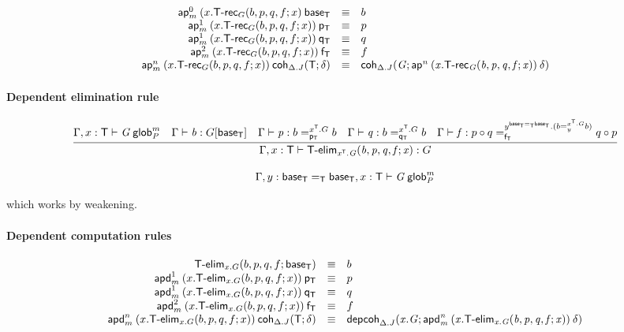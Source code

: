 \begin{small}
  \[
  \begin{array}{rcl}
    \mathsf{ap}^{0}_{m} \: {(x.\mathsf{T\text{-}rec}_G(b, p, q, f; x)} \: {\mathsf{base_T}} & \equiv & b\\
    \mathsf{ap}^{1}_{m} \: {(x.\mathsf{T\text{-}rec}_G(b, p, q, f; x))} \: {\mathsf{p_T}} & \equiv & p\\
    \mathsf{ap}^{1}_{m} \: {(x.\mathsf{T\text{-}rec}_G(b, p, q, f; x))} \: {\mathsf{q_T}} & \equiv & q\\
    \mathsf{ap}^{2}_{m} \: {(x.\mathsf{T\text{-}rec}_G(b, p, q, f; x))} \: {\mathsf{f_T}} & \equiv & f\\
    \mathsf{ap}^{n}_{m} \: {(x.\mathsf{T\text{-}rec}_G(b, p, q, f; x))} \: {\mathsf{coh}_{\Delta.J} \mathit{(\mathsf{T};\delta)}} & \equiv &
    \mathsf{coh}_{\Delta.J} \mathit{(G;\mathsf{ap}^{n} \: {(x.\mathsf{T\text{-}rec}_G(b, p, q, f; x))} \: {\delta})}
  \end{array}
  \]
\end{small}

\paragraph{Dependent elimination rule}

\begin{small}
  \[
  \infer{\ofglob{\Gamma,x:\dsd{T}}{\dsd{T\text{-}elim}_{x^\dsd{T}.G}
      (b, p, q, f; x)}{G}}
  {\wfglob{\Gamma,x:\dsd{T}}{G}{m}{P}
    & \ofglob{\Gamma}{b}{G[\baseT]}
    & \ofglob{\Gamma}{p}{\dhomj{x^{\dsd{T}}.G}{b}{b}{\pT}}
    & \ofglob{\Gamma}{q}{\dhomj{x^{\dsd{T}}.G}{b}{b}{\qT}}
    & \ofglob{\Gamma}{f}{\dhomj{y^{\homj{\dsd{T}}{\baseT}{\baseT}}.(\dhomj{x^{\dsd{T}}.G}{b}{b}{y})}
      {p\circ q}{q \circ p}{\fT}}}
  \]
\end{small}

\[\text{\ensuremath{\Gamma,y:\mathsf{base_T} =_{\mathsf{T}} \mathsf{base_T},x:\mathsf{T}}} \vdash \mathit{G} \: \mathsf{glob}^{m}_{\mathit{P}}\]

which works by weakening.


\paragraph{Dependent computation rules}

\[
\begin{array}{rcl}
\mathsf{T\text{-}elim}_{x.G}(b, p, q, f; \mathsf{base_T}) & \equiv & b \\
\mathsf{apd}^{1}_{m} \: {(x.\mathsf{T\text{-}elim}_{x.G}(b, p, q, f; x))} \: {\mathsf{p_T}} & \equiv & p\\
\mathsf{apd}^{1}_{m} \: {(x.\mathsf{T\text{-}elim}_{x.G}(b, p, q, f; x))} \: {\mathsf{q_T}} & \equiv & q\\
\mathsf{apd}^{2}_{m} \: {(x.\mathsf{T\text{-}elim}_{x.G}(b, p, q, f; x))} \: {\mathsf{f_T}} & \equiv & f\\
\mathsf{apd}^{n}_{m} \: {(x.\mathsf{T\text{-}elim}_{x.G}(b, p, q, f; x))} \: {\mathsf{coh}_{\Delta.J} \mathit{(\mathsf{T};\delta)}} & \equiv &
\mathsf{depcoh}_{\Delta.J} \mathit{(x.G;\mathsf{apd}^{n}_{m} \: {(x.\mathsf{T\text{-}elim}_{x.G}(b, p, q, f; x))} \: {\delta})}
\end{array}
\]

